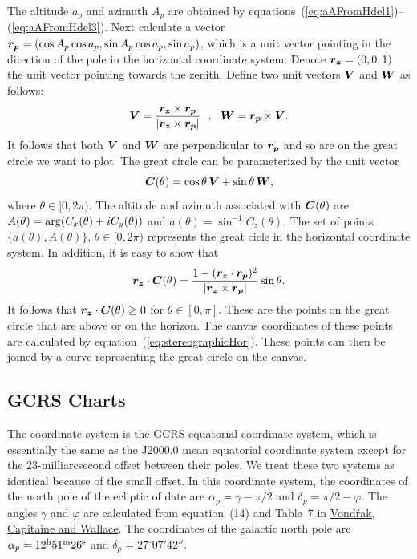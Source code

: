 \documentclass[12pt]{article}
\newcommand \beq {\begin{equation}}
\newcommand \eeq {\end{equation}}
\newcommand{\ve}[1]{\mbox{\boldmath $#1$}}
\begin{document}
The altitude $a_p$ and azimuth $A_p$ are obtained by 
equations~(\ref{eq:aAFromHdel1})--(\ref{eq:aAFromHdel3}). Next calculate a vector 
$\ve{r_p} = (\cos A_p \cos a_p, \sin A_p \cos a_p, \sin a_p)$, which is a unit 
vector pointing in the direction of the pole in the horizontal coordinate system.
Denote $\ve{r_z}=(0,0,1)$ the unit vector pointing towards the zenith. Define two 
unit vectors $\ve{V}$ and $\ve{W}$ as follows:
\beq
  \ve{V} = \frac{\ve{r_z}\times \ve{r_p}}{|\ve{r_z}\times \ve{r_p}|} \ \ , \ \ 
  \ve{W} = \ve{r_p} \times \ve{V} .
\eeq
It follows that both $\ve{V}$ and $\ve{W}$ are perpendicular to $\ve{r_p}$ and so 
are on the great circle we want to plot. The great circle can be parameterized by 
the unit vector
\beq
  \ve{C}(\theta) = \cos \theta \, \ve{V} + \sin \theta \, \ve{W} ,
\eeq
where $\theta \in [0,2\pi)$. The altitude and azimuth associated with 
$\ve{C}(\theta)$ are $A(\theta)={\rm arg}(C_x(\theta) + i C_y(\theta))$ and 
$a(\theta) = \sin^{-1} C_z(\theta)$. The set of points $\{ a(\theta), A(\theta) \}$, 
$\theta \in [0,2\pi)$ represents the great cicle in the horizontal coordinate 
system. In addition, it is easy to show that 
\beq
  \ve{r_z} \cdot \ve{C}(\theta) = \frac{1-(\ve{r_z}\cdot \ve{r_p})^2}
{|\ve{r_z}\times \ve{r_p}|} 
\sin \theta .
\eeq
It follows that $\ve{r_z} \cdot \ve{C}(\theta) \geq 0$ for $\theta \in [0,\pi]$. 
These are the points on the great circle that are above or on the horizon. 
The canvas coordinates of these points are calculated by 
equation~(\ref{eq:stereographicHor}). These points can then be joined by a 
curve representing the great circle on the canvas.

\subsection{GCRS Charts} 

The coordinate system is the GCRS equatorial coordinate system, which is essentially 
the same as the J2000.0 mean equatorial coordinate system except for the 
23-milliarcsecond offset between their poles. We treat these two systems 
as identical because of the small offset. In this coordinate system, the 
coordinates of the north pole of the ecliptic of date are $\alpha_p = \gamma-\pi/2$ 
and $\delta_p = \pi/2 - \varphi$. The angles $\gamma$ and $\varphi$ are 
calculated from equation~(14) and Table~7 in
\href{http://adsabs.harvard.edu/abs/2011A%26A...534A..22V}{Vond\'rak,
Capitaine and Wallace}. The coordinates of the galactic north pole are 
$\alpha_{p} = 12^{\rm h} 51^{\rm m} 26^{\rm s}$ and $\delta_{p} = 27^\circ 07' 42''$. 
\end{document}
